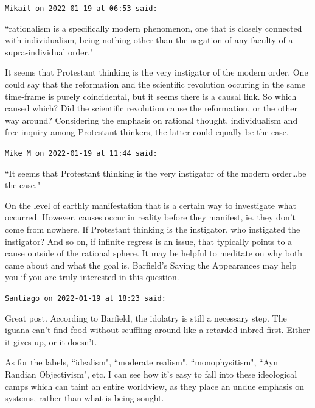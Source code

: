 \begin{footnotesize}\begin{sffamily}



\texttt{Mikail on 2022-01-19 at 06:53 said: }

``rationalism is a specifically modern phenomenon, one that is closely connected with individualism, being nothing other than the negation of any faculty of a supra-individual order."

It seems that Protestant thinking is the very instigator of the modern order. One could say that the reformation and the scientific revolution occuring in the same time-frame is purely coincidental, but it seems there is a causal link. So which caused which? Did the scientific revolution cause the reformation, or the other way around? Considering the emphasis on rational thought, individualism and free inquiry among Protestant thinkers, the latter could equally be the case.


\hfill

\texttt{Mike M on 2022-01-19 at 11:44 said: }

``It seems that Protestant thinking is the very instigator of the modern order…be the case."

On the level of earthly manifestation that is a certain way to investigate what occurred. However, causes occur in reality before they manifest, ie. they don't come from nowhere. If Protestant thinking is the instigator, who instigated the instigator? And so on, if infinite regress is an issue, that typically points to a cause outside of the rational sphere. It may be helpful to meditate on why both came about and what the goal is. Barfield's Saving the Appearances may help you if you are truly interested in this question.


\hfill

\texttt{Santiago on 2022-01-19 at 18:23 said: }

Great post. According to Barfield, the idolatry is still a necessary step. The iguana can't find food without scuffling around like a retarded inbred first. Either it gives up, or it doesn't.

As for the labels, ``idealism", ``moderate realism", ``monophysitism", ``Ayn Randian Objectivism", etc. I can see how it's easy to fall into these ideological camps which can taint an entire worldview, as they place an undue emphasis on systems, rather than what is being sought.


\hfill


\end{sffamily}
\end{footnotesize}
